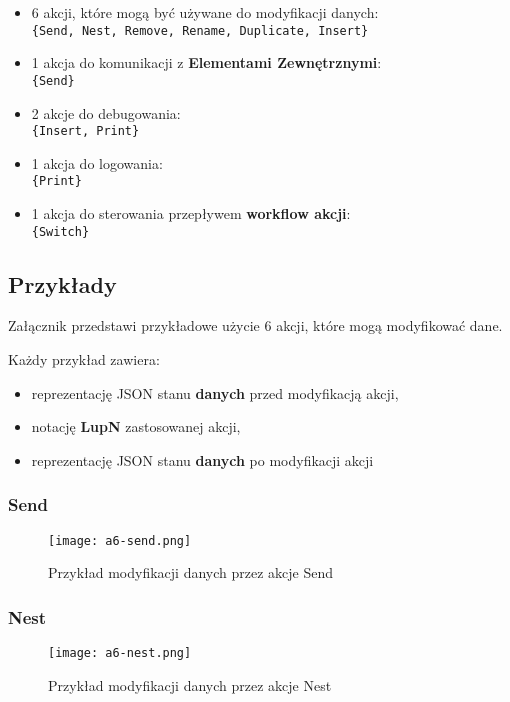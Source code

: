 \begin{itemize}
    \item 6 akcji, które mogą być używane do modyfikacji danych: \\ 
          \texttt{\{Send, Nest, Remove, Rename, Duplicate, Insert\}}
    \item 1 akcja do komunikacji z \textbf{Elementami Zewnętrznymi}: \\ 
          \texttt{\{Send\}}
    \item 2 akcje do debugowania: \\ 
          \texttt{\{Insert, Print\}}
    \item 1 akcja do logowania: \\ 
          \texttt{\{Print\}}
    \item 1 akcja do sterowania przepływem \textbf{workflow akcji}: \\ 
          \texttt{\{Switch\}}
\end{itemize}

\subsection{Przykłady}

Załącznik przedstawi przykładowe użycie 6 akcji, które mogą modyfikować dane.

Każdy przykład zawiera:

\begin{itemize}
    \item reprezentację JSON stanu \textbf{danych} przed modyfikacją akcji,
    \item notację \textbf{LupN} zastosowanej akcji,
    \item reprezentację JSON stanu \textbf{danych} po modyfikacji akcji
\end{itemize}

\subsubsection{Send}
\begin{figure}[!h]
    \centering \texttt{[image: a6-send.png]}
    \caption{Przykład modyfikacji danych przez akcje Send}\label{fig:a6-send}
\end{figure}
\subsubsection{Nest}
\begin{figure}[!h]
    \centering \texttt{[image: a6-nest.png]}
    \caption{Przykład modyfikacji danych przez akcje Nest}\label{fig:a6-nest}
\end{figure}
